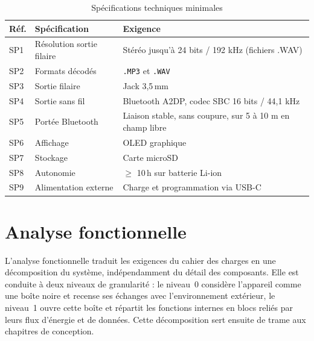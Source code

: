 \begin{table}[h]
      \centering
      \caption{Spécifications techniques minimales}
      \label{tab:specs}
      \small
      \begin{tabular}{lll}
            \hline
            \textbf{Réf.} & \textbf{Spécification}    & \textbf{Exigence}                                         \\
            \hline
            SP1           & Résolution sortie filaire & Stéréo jusqu'à 24 bits / 192 kHz (fichiers .WAV)          \\
            SP2           & Formats décodés           & \texttt{.MP3} et \texttt{.WAV}                            \\
            SP3           & Sortie filaire            & Jack 3,5\,mm                                              \\
            SP4           & Sortie sans fil           & Bluetooth A2DP, codec SBC 16 bits / 44,1 kHz              \\
            SP5           & Portée Bluetooth          & Liaison stable, sans coupure, sur 5 à 10 m en champ libre \\
            SP6           & Affichage                 & OLED graphique                                            \\
            SP7           & Stockage                  & Carte microSD                                             \\
            SP8           & Autonomie                 & $\geq$ 10\,h sur batterie Li-ion                          \\
            SP9           & Alimentation externe      & Charge et programmation via USB-C                         \\
            \hline
      \end{tabular}
\end{table}

\section{Analyse fonctionnelle}
L'analyse fonctionnelle traduit les exigences du cahier des charges en une décomposition du système, indépendamment du détail des composants. Elle est conduite à deux niveaux de granularité : le niveau~0 considère l'appareil comme une boîte noire et recense ses échanges avec l'environnement extérieur, le niveau~1 ouvre cette boîte et répartit les fonctions internes en blocs reliés par leurs flux d'énergie et de données. Cette décomposition sert ensuite de trame aux chapitres de conception.

